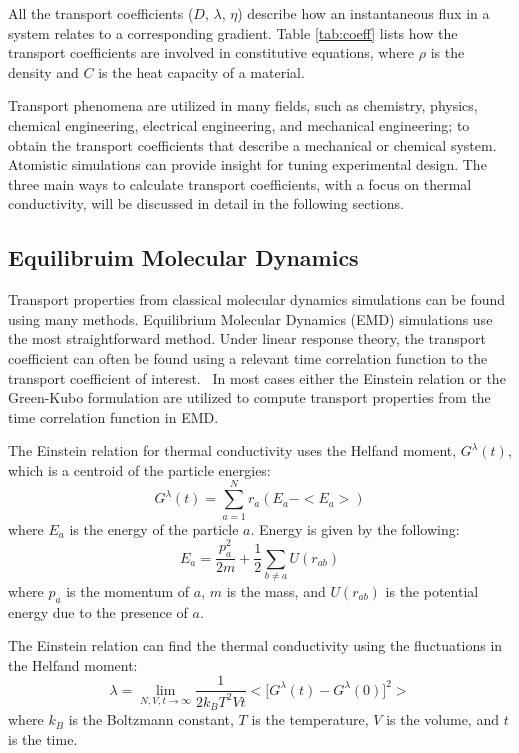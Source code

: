 All the transport coefficients ($D$, $\lambda$, $\eta$) describe how an instantaneous flux in a system relates to a corresponding gradient. Table \ref{tab:coeff} lists how the transport coefficients are involved in constitutive equations, where $\rho$ is the density and $C$ is the heat capacity of a material.

Transport phenomena are utilized in many fields, such as chemistry, physics, chemical engineering, electrical engineering, and mechanical engineering; to obtain the transport coefficients that describe a mechanical or chemical system. Atomistic simulations can provide insight for tuning experimental design. The three main ways to calculate transport coefficients, with a focus on thermal conductivity, will be discussed in detail in the following sections.

\subsection{Equilibruim Molecular Dynamics}
Transport properties from classical molecular dynamics simulations can be found using many methods. Equilibrium Molecular Dynamics (EMD) simulations use the most straightforward method. Under linear response theory, the transport coefficient can often be found using a relevant time correlation function to the transport coefficient of interest.~\cite{Heyes:1988ee,MASSOBRIO:1984bl,Helfand:1960os,Viscardy:2007rp,che:6888,kinaci:014106} In most cases either the Einstein relation or the Green-Kubo formulation are utilized to compute transport properties from the time correlation function in EMD.

The Einstein relation for thermal conductivity uses the Helfand moment, $G^\lambda (t)$, which is a centroid of the particle energies:
\begin{equation}
    G^\lambda (t) = \sum^{N}_{a=1} r_a (E_a - <E_a>)
\end{equation}
where $E_a$ is the energy of the particle $a$. Energy is given by the following: 
\begin{equation}
    E_a = \frac{p_a^2}{2m} + \frac{1}{2}\sum_{b\neq a} U(r_{ab})
\end{equation}
where $p_a$ is the momentum of $a$, $m$ is the mass, and $U(r_{ab})$ is the potential energy due to the presence of $a$.

The Einstein relation can  find the thermal conductivity using the fluctuations in the Helfand moment:
\begin{equation}
    \lambda = \lim_{N,V,t \rightarrow \infty} \frac{1}{2k_B T^2 Vt} \bigg< \Big[ G^\lambda (t) - G^\lambda (0) \Big]^2\bigg>
\end{equation}
where $k_B$ is the Boltzmann constant, $T$ is the temperature, $V$ is the volume, and $t$ is the time.

